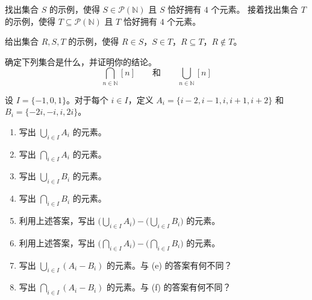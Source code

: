 \begin{exercise}
    找出集合 $S$ 的示例，使得 $S \in \mathcal{P}(\mathbb{N})$ 且 $S$ 恰好拥有 $4$ 个元素。
    接着找出集合 $T$ 的示例，使得 $T \subseteq \mathcal{P}(\mathbb{N})$ 且 $T$ 恰好拥有 $4$ 个元素。
\end{exercise}

\begin{exercise}
    给出集合 $R,S,T$ 的示例，使得 $R \in S$，$S \in T$，$R \subseteq T$，$R \notin T$。
\end{exercise}

\begin{exercise}
    确定下列集合是什么，并证明你的结论。
    \[\bigcap_{n \in \mathbb{N}}[n] \qquad \text{和} \qquad \bigcup_{n \in \mathbb{N}}[n]\]
\end{exercise}

\begin{exercise}
    设 $I = \{-1, 0, 1\}$。对于每个 $i \in I$，定义 $A_i = \{i - 2, i - 1, i, i + 1, i + 2\}$ 和 $B_i = \{-2i, -i, i, 2i\}$。
    \begin{enumerate}[label=(\alph*)]
        \item 写出 $\displaystyle{\bigcup_{i \in I}A_i}$ 的元素。
        \item 写出 $\displaystyle{\bigcap_{i \in I}A_i}$ 的元素。
        \item 写出 $\displaystyle{\bigcup_{i \in I}B_i}$ 的元素。
        \item 写出 $\displaystyle{\bigcap_{i \in I}B_i}$ 的元素。
        \item 利用上述答案，写出 $\displaystyle{\Big(\bigcup_{i \in I}A_i\Big) - \Big(\bigcup_{i \in I}B_i\Big)}$ 的元素。
        \item 利用上述答案，写出 $\displaystyle{\Big(\bigcap_{i \in I}A_i\Big) - \Big(\bigcap_{i \in I}B_i\Big)}$ 的元素。
        \item 写出 $\displaystyle{\bigcup_{i \in I}(A_i - B_i)}$ 的元素。与 (e) 的答案有何不同？
        \item 写出 $\displaystyle{\bigcap_{i \in I}(A_i - B_i)}$ 的元素。与 (f) 的答案有何不同？
    \end{enumerate}
\end{exercise}

